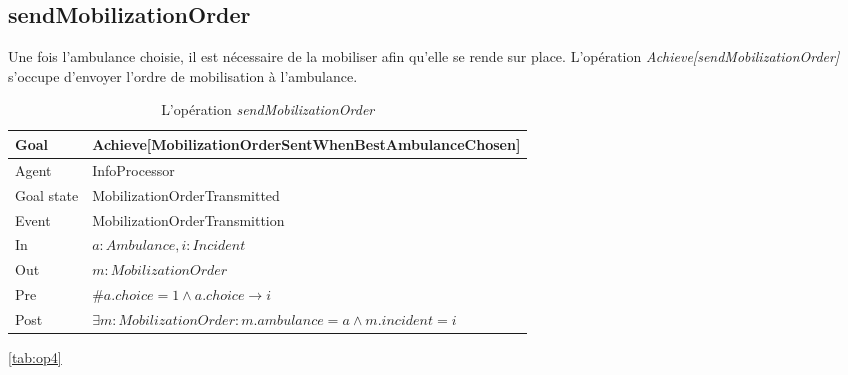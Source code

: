 \subsection{sendMobilizationOrder}

	Une fois l'ambulance choisie, il est nécessaire de la mobiliser afin 
	qu'elle se rende sur place. L'opération \textit{Achieve[sendMobilizationOrder]}
	s'occupe d'envoyer l'ordre de mobilisation à l'ambulance.
	
	
	\begin{table}[!h] \centering
		\begin{tabularx}{\textwidth}{|l|X|} \hline
			Goal & Achieve[MobilizationOrderSentWhenBestAmbulanceChosen] \\ \hline
			Agent & InfoProcessor \\ \hline
			Goal state & MobilizationOrderTransmitted \\ \hline
			Event & MobilizationOrderTransmittion \\ \hline
			In & $a: Ambulance, i: Incident$ \\ \hline
			Out & $m: MobilizationOrder$ \\ \hline
			Pre & $\#a.choice = 1 \wedge a.choice \rightarrow i$ \\ \hline
			Post & $\exists m: MobilizationOrder : m.ambulance = a \wedge m.incident = i$ \\ \hline
		\end{tabularx}
		\caption{L'opération \textit{sendMobilizationOrder}}\ref{tab:op4}
	\end{table}
